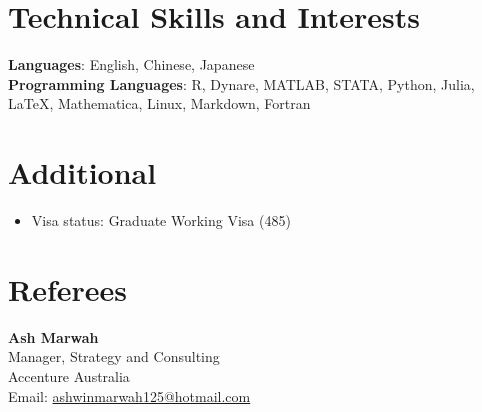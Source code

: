 \documentclass[a4paper,11pt]{article}
\newcommand{\resumeItemListStart}{\begin{justify}\begin{itemize}[leftmargin=3ex, rightmargin=2ex, noitemsep,labelsep=1.2mm,itemsep=0mm]\small}
\newcommand{\resumeItemListEnd}{\end{itemize}\end{justify}\vspace{-2mm}}
\begin{document}
\section{\textbf{Technical Skills and Interests}}
 \begin{itemize}[leftmargin=0.05in, label={}]
    \small{\item{
     \textbf{Languages}{: English, Chinese, Japanese} \\
     \textbf{Programming Languages}{: R, Dynare, MATLAB, STATA, Python, Julia, LaTeX, Mathematica, Linux, Markdown, Fortran} \\
    }}
 \end{itemize}
 \vspace{-16pt}

 \section{\textbf{Additional}}
 \resumeItemListStart
   \item {Visa status: Graduate Working Visa (485)}
 \resumeItemListEnd

\section{\textbf{Referees}}
 \textbf{Ash Marwah} \\
 Manager, Strategy and Consulting \\
 Accenture Australia \\
 Email: \href{mailto:ashwinmarwah125@hotmail.com}{ashwinmarwah125@hotmail.com} \\
 \vspace{3mm}





\end{document}
